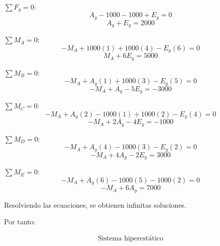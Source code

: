 \documentclass[letter,10pt,twoside]{article}
\begin{document}
$\sum{F_y} = 0$:
\begin{equation*}
    A_y - 1000 - 1000 + E_y = 0
\end{equation*}
\begin{equation*}
    A_y + E_y = 2000
\end{equation*}

$\sum{M_A} = 0$:
\begin{equation*}
    - M_A + 1000(1) + 1000(4) - E_y(6) = 0
\end{equation*}
\begin{equation*}
    M_A + 6E_y = 5000
\end{equation*}

$\sum{M_B} = 0$:
\begin{equation*}
    - M_A + A_y(1) + 1000(3) - E_y(5) = 0
\end{equation*}
\begin{equation*}
    - M_A + A_y - 5 E_y = -3000
\end{equation*}

$\sum{M_C} = 0$:
\begin{equation*}
    - M_A + A_y(2) - 1000(1) + 1000(2) - E_y(4) = 0
\end{equation*}
\begin{equation*}
    - M_A + 2 A_y - 4 E_y = -1000
\end{equation*}

$\sum{M_D} = 0$:
\begin{equation*}
    - M_A + A_y(4) - 1000(3) - E_y(2) = 0
\end{equation*}
\begin{equation*}
    - M_A + 4 A_y - 2 E_y = 3000
\end{equation*}

$\sum{M_E} = 0$:
\begin{equation*}
    - M_A + A_y (6) - 1000(5) - 1000(2) = 0
\end{equation*}
\begin{equation*}
    - M_A + 6 A_y = 7000
\end{equation*}

Resolviendo las ecuaciones, se obtienen infinitas soluciones.

Por tanto:

\begin{equation*}
\boxed{
    \begin{array}{l}
        \text{Sistema hiperestático}
    \end{array}
}
\end{equation*}
\end{document}
